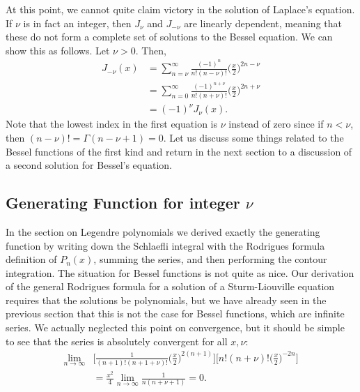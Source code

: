At this point, we cannot quite claim victory in the solution of Laplace's equation.
If $\nu$ is in fact an integer, then $J_{\nu}$ and $J_{-\nu}$ are linearly dependent, meaning that these do not form a complete set of solutions to the Bessel equation.
We can show this as follows.
Let $\nu > 0$.
Then,
\begin{align}
    J_{-\nu}(x) &= \sum_{n=\nu}^{\infty} \frac{(-1)^{n}}{n!(n-\nu)!} \Big( \frac{x}{2} \Big)^{2n-\nu} \nonumber \\
                &= \sum_{n=0}^{\infty} \frac{(-1)^{n+\nu}}{n!(n+\nu)!} \Big( \frac{x}{2} \Big)^{2n + \nu} \nonumber \\
                &= (-1)^{\nu} J_{\nu}(x)
.\end{align}
Note that the lowest index in the first equation is $\nu$ instead of zero since if $n < \nu$, then $(n-\nu)! = \Gamma(n - \nu + 1) = 0$.
Let us discuss some things related to the Bessel functions of the first kind and return in the next section to a discussion of a second solution for Bessel's equation.


\subsection{Generating Function for integer $\nu$}

In the section on Legendre polynomials we derived exactly the generating function by writing down the Schlaefli integral with the Rodrigues formula definition of $P_{n}(x)$, summing the series, and then performing the contour integration.
The situation for Bessel functions is not quite as nice.
Our derivation of the general Rodrigues formula for a solution of a Sturm-Liouville equation requires that the solutions be polynomials, but we have already seen in the previous section that this is not the case for Bessel functions, which are infinite series.
We actually neglected this point on convergence, but it should be simple to see that the series  is absolutely convergent for all $x,\nu$:
\begin{align}
    \lim_{n \rightarrow \infty} &\Bigg[ \frac{1}{(n+1)!(n+1+\nu)!} \Big( \frac{x}{2} \Big)^{2(n+1)} \Bigg] \Bigg[ n! (n+\nu)! \Big( \frac{x}{2} \Big)^{-2n} \Bigg] \nonumber \\
                                &= \frac{x^2}{4} \lim_{n \rightarrow \infty} \frac{1}{n(n+\nu+1)} = 0
.\end{align}


